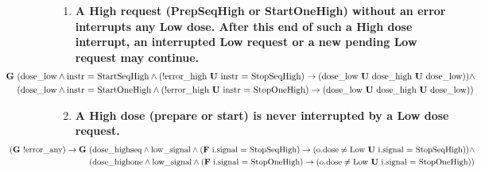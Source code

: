 \documentclass[a4paper,10pt]{article}
\newcommand{\LTLG}{\mathbf{G~}}
\newcommand{\LTLF}{\mathbf{F~}}
\newcommand{\LTLU}{\mathbf{~U~}}
\newcommand{\imply}{\rightarrow}
\newcommand{\doselow}{\textrm{dose\_low}}
\newcommand{\dosehigh}{\textrm{dose\_high}}
\newcommand{\dosehighseq}{\textrm{dose\_highseq}}
\newcommand{\dosehighone}{\textrm{dose\_highone}}
\newcommand{\lowsignal}{\textrm{low\_signal}}
\newcommand{\errorany}{\textrm{error\_any}}
\newcommand{\errorhigh}{\textrm{error\_high}}
\begin{document}
\begin{enumerate}
		\item \textbf{A High request (PrepSeqHigh or StartOneHigh) without an error interrupts any Low dose. After this end of such a High dose interrupt, an interrupted Low request or a new pending Low request may continue.}
			\begin{align*}
				\hspace{-8em}\LTLG & (\doselow \land \textrm{instr = StartSeqHigh} \land (!\errorhigh \LTLU \textrm{instr = StopSeqHigh}) \imply (\doselow \LTLU \dosehigh \LTLU \doselow)) \land \\
				\hspace{-8em}	&(\doselow \land \textrm{instr = StartOneHigh} \land (!\errorhigh \LTLU \textrm{instr = StopOneHigh}) \imply (\doselow \LTLU \dosehigh \LTLU \doselow))
			\end{align*}

		\item \textbf{A High dose (prepare or start) is never interrupted by a Low dose request.}
			\begin{align*}
				\hspace{-8em}(\LTLG !\errorany) \imply \LTLG & (\dosehighseq \land \lowsignal \land (\LTLF \textrm{i.signal = StopSeqHigh}) \imply (\textrm{o.dose} \neq \textrm{Low} \LTLU \textrm{i.signal = StopSeqHigh})) \land \\
				\hspace{-8em}	& (\dosehighone \land \lowsignal \land (\LTLF \textrm{i.signal = StopOneHigh}) \imply (\textrm{o.dose} \neq \textrm{Low} \LTLU \textrm{i.signal = StopOneHigh}))
			\end{align*}


\end{enumerate}
\end{document}
